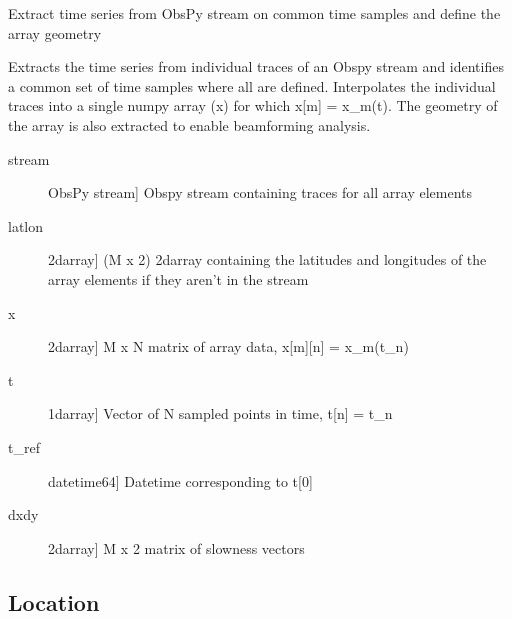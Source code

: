 \documentclass[letterpaper,10pt,english]{sphinxmanual}
\begin{document}
\begin{fulllineitems}
\label{\detokenize{infrapy.detection:infrapy.detection.beamforming_new.stream_to_array_data}}
Extract time series from ObsPy stream on common time samples and define the array geometry

Extracts the time series from individual traces of an Obspy stream and identifies a
common set of time samples where all are defined.  Interpolates the individual traces
into a single numpy array (x) for which x{[}m{]} = x\_m(t).  The geometry of the array is
also extracted to enable beamforming analysis.
\begin{description}
\item[{stream}] \leavevmode{[}ObsPy stream{]}
Obspy stream containing traces for all array elements

\item[{latlon}] \leavevmode{[}2darray{]}
(M x 2) 2darray containing the latitudes and longitudes of the array elements if they aren’t in the stream

\end{description}
\begin{description}
\item[{x}] \leavevmode{[}2darray{]}
M x N matrix of array data, x{[}m{]}{[}n{]} = x\_m(t\_n)

\item[{t}] \leavevmode{[}1darray{]}
Vector of N sampled points in time, t{[}n{]} = t\_n

\item[{t\_ref}] \leavevmode{[}datetime64{]}
Datetime corresponding to t{[}0{]}

\item[{dxdy}] \leavevmode{[}2darray{]}
M x 2 matrix of slowness vectors

\end{description}

\end{fulllineitems}



\subsection{Location}
\label{\detokenize{infrapy.location:location}}\label{\detokenize{infrapy.location::doc}}
\end{document}

